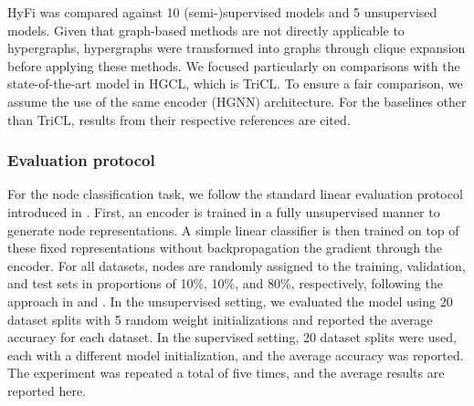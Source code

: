 HyFi was compared against 10 (semi-)supervised models and 5 unsupervised models. Given that graph-based methods are not directly applicable to hypergraphs, hypergraphs were transformed into graphs through clique expansion before applying these methods. We focused particularly on comparisons with the state-of-the-art model in HGCL, which is TriCL. To ensure a fair comparison, we assume the use of the same encoder (HGNN) architecture. For the baselines other than TriCL, results from their respective references are cited. 


\subsubsection{Evaluation protocol}
For the node classification task, we follow the standard linear evaluation protocol introduced in \cite{velivckovic2018deep}. First, an encoder is trained in a fully unsupervised manner to generate node representations. A simple linear classifier is then trained on top of these fixed representations without backpropagation the gradient through the encoder. For all datasets, nodes are randomly assigned to the training, validation, and test sets in proportions of 10\%, 10\%, and 80\%, respectively, following the approach in \cite{zhu2020deep} and \cite{thakoorlarge}. In the unsupervised setting, we evaluated the model using 20 dataset splits with 5 random weight initializations and reported the average accuracy for each dataset. In the supervised setting, 20 dataset splits were used, each with a different model initialization, and the average accuracy was reported. The experiment was repeated a total of five times, and the average results are reported here.


